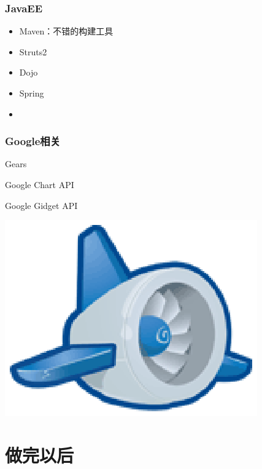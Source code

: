 \documentclass[dvipdfm,serif,mathserif]{beamer}
\begin{document}
\begin{frame}
  \frametitle{JavaEE}
\begin{itemize}
 \item Maven：不错的构建工具
 \item Struts2
  \item Dojo
  \item Spring
   \item \color{darkblue}{CXF(Celtix/Xfire) or Axis2：Web Service}
\end{itemize}
\end{frame}

\begin{frame}
  \frametitle{Google相关}
\begin{itemize}
\begin{minipage}[c]{0.6\textwidth}
 \item Gears
 \item Google Chart API
 \item Google Gidget API
 \item \color{darkblue}{Google App Engine}
  \end{minipage}
  \begin{minipage}[c]{0.3\textwidth}
  \includegraphics[width=\textwidth]{appengine_lowres.ps}
  \end{minipage}
\end{itemize}
\end{frame}

\section{做完以后}
\end{document}
